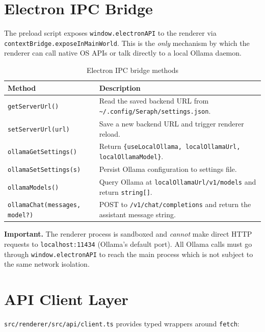 \documentclass[11pt,a4paper,twoside,openright]{book}
\begin{document}
\section{Electron IPC Bridge}

The preload script exposes \texttt{window.electronAPI} to the renderer via \texttt{contextBridge.exposeInMainWorld}. This is the \emph{only} mechanism by which the renderer can call native OS APIs or talk directly to a local Ollama daemon.

\begin{table}[H]
\centering
\begin{tabularx}{\textwidth}{L{5cm} X}
\toprule
\textbf{Method} & \textbf{Description} \\
\midrule
\texttt{getServerUrl()} & Read the saved backend URL from \texttt{\textasciitilde/.config/Seraph/settings.json}. \\
\texttt{setServerUrl(url)} & Save a new backend URL and trigger renderer reload. \\
\texttt{ollamaGetSettings()} & Return \texttt{\{useLocalOllama, localOllamaUrl, localOllamaModel\}}. \\
\texttt{ollamaSetSettings(s)} & Persist Ollama configuration to settings file. \\
\texttt{ollamaModels()} & Query Ollama at \texttt{localOllamaUrl/v1/models} and return \texttt{string[]}. \\
\texttt{ollamaChat(messages, model?)} & POST to \texttt{/v1/chat/completions} and return the assistant message string. \\
\bottomrule
\end{tabularx}
\caption{Electron IPC bridge methods}
\end{table}

\begin{warningbox}
\textbf{Important.} The renderer process is sandboxed and \emph{cannot} make direct HTTP requests to \texttt{localhost:11434} (Ollama's default port). All Ollama calls must go through \texttt{window.electronAPI} to reach the main process which is not subject to the same network isolation.
\end{warningbox}

\section{API Client Layer}

\texttt{src/renderer/src/api/client.ts} provides typed wrappers around \texttt{fetch}:
\end{document}
